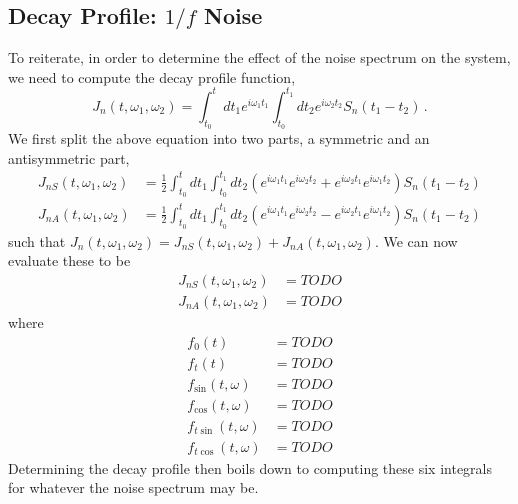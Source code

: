 \subsection{Decay Profile: $1/f$ Noise}

To reiterate, in order to determine the effect of the noise spectrum on the system, we need to compute the decay profile function,
\begin{equation*}
    J_n(t,\omega_1,\omega_2) = \int_{t_0}^tdt_1e^{i\omega_1t_1}\int_{t_0}^{t_1}dt_2 e^{i\omega_2t_2} S_n(t_1-t_2) \,.
\end{equation*}
We first split the above equation into two parts, a symmetric and an antisymmetric part,
\begin{align}
    J_{nS}(t,\omega_1,\omega_2) & = \frac{1}{2}\int_{t_0}^tdt_1\int_{t_0}^{t_1}dt_2 (e^{i\omega_1t_1}e^{i\omega_2t_2}+e^{i\omega_2t_1}e^{i\omega_1t_2}) S_n(t_1-t_2) \\
    J_{nA}(t,\omega_1,\omega_2) & = \frac{1}{2}\int_{t_0}^tdt_1\int_{t_0}^{t_1}dt_2 (e^{i\omega_1t_1}e^{i\omega_2t_2}-e^{i\omega_2t_1}e^{i\omega_1t_2}) S_n(t_1-t_2)
\end{align}
such that $J_n(t,\omega_1,\omega_2) = J_{nS}(t,\omega_1,\omega_2) + J_{nA}(t,\omega_1,\omega_2)$.
We can now evaluate these to be
\begin{align}
    J_{nS}(t,\omega_1,\omega_2) & = TODO \\
    J_{nA}(t,\omega_1,\omega_2) & = TODO
\end{align}
where
\begin{subequations}\label{EQ:f_integrals_generic}
    \begin{align}
        f_0(t)              & = TODO \\
        f_t(t)              & = TODO \\
        f_{\sin}(t,\omega)  & = TODO \\
        f_{\cos}(t,\omega)  & = TODO \\
        f_{t\sin}(t,\omega) & = TODO \\
        f_{t\cos}(t,\omega) & = TODO
    \end{align}
\end{subequations}
Determining the decay profile then boils down to computing these six integrals for whatever the noise spectrum may be.


